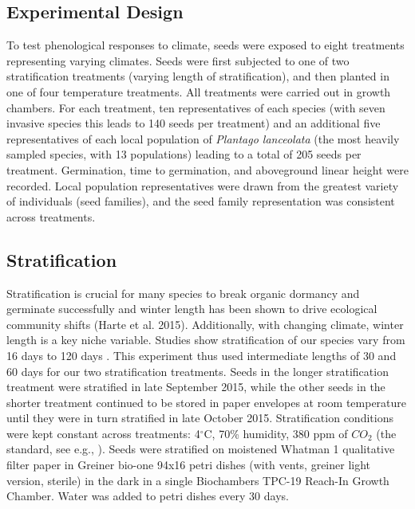 \documentclass[12pt]{article}\usepackage[]{graphicx}\usepackage[]{color}
\begin{document}
	\subsection{Experimental Design}
	To test phenological responses to climate, seeds were exposed to eight treatments representing varying climates. Seeds were first subjected to one of two stratification treatments (varying length of stratification), and then planted in one of four temperature treatments. All treatments were carried out in growth chambers. For each treatment, ten representatives of each species (with seven invasive species this leads to 140 seeds per treatment) and an additional five representatives of each local population of \textit{Plantago lanceolata} (the most heavily sampled species, with 13 populations) leading to a total of 205 seeds per treatment. Germination, time to germination, and aboveground linear height were recorded. Local population representatives were drawn from the greatest variety of individuals (seed families), and the seed family representation was consistent across treatments. 
	
	\subsection{Stratification}
	Stratification is crucial for many species to break organic dormancy and germinate successfully \parencite{Baskin1998,Popay1970,Wulff1994} and winter length has been shown to drive ecological community shifts (Harte et al. 2015). Additionally, with changing climate, winter length is a key niche variable. Studies show stratification of our species vary from 16 days \parencite{Popay1970} to 120 days \parencite{Meekins1999}. This experiment thus used intermediate lengths of 30 and 60 days for our two stratification treatments. Seeds in the longer stratification treatment were stratified in late September 2015, while the other seeds in the shorter treatment continued to be stored in paper envelopes at room temperature until they were in turn stratified in late October 2015. Stratification conditions were kept constant across treatments:  4$^\circ$C, 70\% humidity, 380 ppm of $CO_2$ (the standard, see e.g., \textcite{Meekins1999,Popay1970}). Seeds were stratified on moistened Whatman 1 qualitative filter paper in Greiner bio-one 94x16 petri dishes (with vents, greiner light version, sterile) in the dark \parencite{Baskin1998,Popay1970} in a single Biochambers TPC-19 Reach-In Growth Chamber.  Water was added to petri dishes every 30 days.
	
\end{document}
